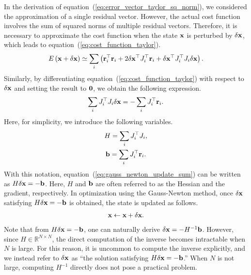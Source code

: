 In the derivation of equation~(\ref{eq:error_vector_taylor_sq_norm}), we considered the approximation of a single residual vector.
However, the actual cost function involves the sum of squared norms of multiple residual vectors.
Therefore, it is necessary to approximate the cost function when the state ${\bf x}$ is perturbed by $\delta {\bf x}$, which leads to equation~(\ref{eq:cost_function_taylor}).
%
\begin{align}
  E \left( {\bf x} + \delta {\bf x} \right) \simeq \sum_{i} \left( {\bf r}_{i}^{\top} {\bf r}_{i} + 2 \delta {\bf x}^{\top} J_{i}^{\top} {\bf r}_{i} + \delta {\bf x}^{\top} J_{i}^{\top} J_{i} \delta {\bf x} \right).
  \label{eq:cost_function_taylor}
\end{align}
%
Similarly, by differentiating equation~(\ref{eq:cost_function_taylor}) with respect to $\delta {\bf x}$ and setting the result to ${\bf 0}$, we obtain the following expression.
%
\begin{align}
  \sum_{i} J_{i}^{\top} J_{i} \delta {\bf x} = -\sum_{i} J_{i}^{\top} {\bf r}_{i}.
  \label{eq:gauss_newton_update_sum}
\end{align}
%
Here, for simplicity, we introduce the following variables.
%
\begin{align}
  \begin{gathered}
    H = \sum_{i} J_{i}^{\top} J_{i}, \\
    {\bf b} = \sum_{i} J_{i}^{\top} {\bf r}_{i}.
  \end{gathered}
  \label{eq:hessian_and_gradient_gauss_newton}
\end{align}
%
With this notation, equation~(\ref{eq:gauss_newton_update_sum}) can be written as $H \delta {\bf x} = -{\bf b}$.
Here, $H$ and ${\bf b}$ are often referred to as the Hessian and the gradient, respectively.
In optimization using the Gauss-Newton method, once $\delta {\bf x}$ satisfying $H \delta {\bf x} = -{\bf b}$ is obtained, the state is updated as follows.
%
\begin{align}
  {\bf x} \leftarrow {\bf x} + \delta {\bf x}.
  \label{eq:gauss_newton_update_vector}
\end{align}
%
Note that from $H \delta {\bf x} = -{\bf b}$, one can naturally derive $\delta {\bf x} = -H^{-1} {\bf b}$.
However, since $H \in \mathbb{R}^{N \times N}$, the direct computation of the inverse becomes intractable when $N$ is large.
For this reason, it is uncommon to compute the inverse explicitly, and we instead refer to $\delta {\bf x}$ as ``the solution satisfying $H \delta {\bf x} = -{\bf b}$.''
When $N$ is not large, computing $H^{-1}$ directly does not pose a practical problem.










